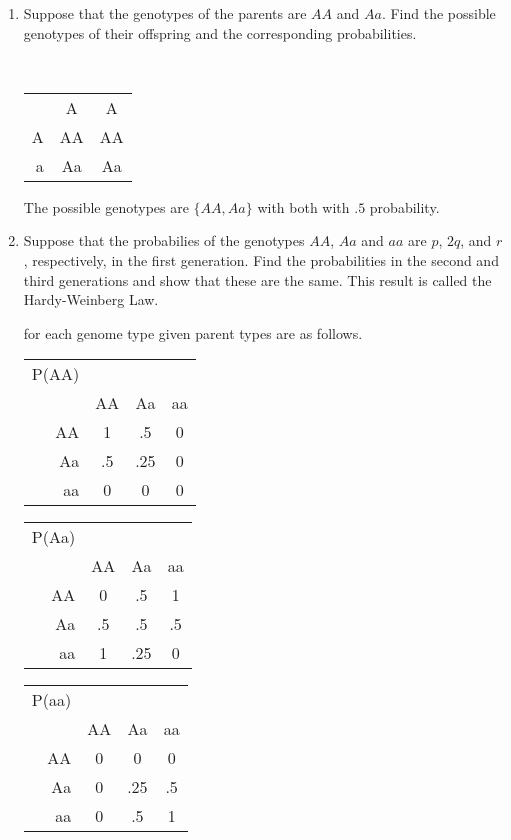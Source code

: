 \documentclass{tufte-book}
\theoremstyle{mytheoremstyle}
\theoremstyle{mylemstyle}
\theoremstyle{mydefstyle}
\begin{document}
\begin{enumerate}
\item Suppose that the genotypes of the parents are $AA$ and $Aa$. Find the possible genotypes of their offspring and the corresponding probabilities.

\\
\begin{tabular}{ r|c|c| }
\multicolumn{1}{r}{}
 &  \multicolumn{1}{c}{A}
 & \multicolumn{1}{c}{A} \\
\cline{2-3}
A & AA & AA \\
\cline{2-3}
a & Aa & Aa \\
\cline{2-3}
\end{tabular}

The possible genotypes are $\{AA, Aa \}$ with both with $.5$ probability.

\item Suppose that the probabilies of the genotypes $AA$, $Aa$ and $aa$ are $p$, $2q$, and $r$, respectively, in the first generation.  Find the probabilities in the second and third generations and show that these are the same.  This result is called the Hardy-Weinberg Law.

 for each genome type given parent types are as follows.

\begin{tabular}{ r|c|c|c| }
\multicolumn{1}{r}{P(AA)}\\
\multicolumn{1}{r}{}
 & \multicolumn{1}{c}{AA}
 & \multicolumn{1}{c}{Aa}
 & \multicolumn{1}{c}{aa} \\
\cline{2-4}
AA & 1 & .5 & 0 \\
\cline{2-4}
Aa & .5 & .25 & 0 \\
\cline{2-4}
aa & 0 & 0 & 0 \\
\cline{2-4}
\end{tabular}

\begin{tabular}{ r|c|c|c| }
\multicolumn{1}{r}{P(Aa)}\\
\multicolumn{1}{r}{}
 & \multicolumn{1}{c}{AA}
 & \multicolumn{1}{c}{Aa}
 & \multicolumn{1}{c}{aa} \\
\cline{2-4}
AA & 0 & .5 & 1 \\
\cline{2-4}
Aa & .5 & .5 & .5 \\
\cline{2-4}
aa & 1 & .25 & 0 \\
\cline{2-4}
\end{tabular}

\begin{tabular}{ r|c|c|c| }
\multicolumn{1}{r}{P(aa)}\\
\multicolumn{1}{r}{}
 & \multicolumn{1}{c}{AA}
 & \multicolumn{1}{c}{Aa}
 & \multicolumn{1}{c}{aa} \\
\cline{2-4}
AA & 0 & 0 & 0 \\
\cline{2-4}
Aa & 0 & .25 & .5 \\
\cline{2-4}
aa & 0 & .5 & 1 \\
\cline{2-4}
\end{tabular}


\end{enumerate}
\end{document}
